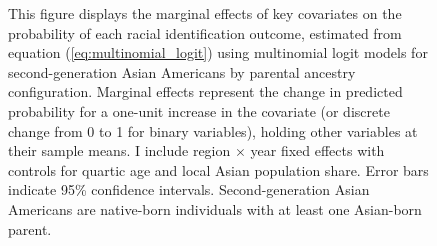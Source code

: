 \begin{center}
\begin{figure}[!htb]
\caption*{\footnotesize{This figure displays the marginal effects of key covariates on the probability of each racial identification outcome, estimated from equation (\ref{eq:multinomial_logit}) using multinomial logit models for second-generation Asian Americans by parental ancestry configuration. Marginal effects represent the change in predicted probability for a one-unit increase in the covariate (or discrete change from 0 to 1 for binary variables), holding other variables at their sample means. I include region $\times$ year fixed effects with controls for quartic age and local Asian population share. Error bars indicate 95\% confidence intervals. Second-generation Asian Americans are native-born individuals with at least one Asian-born parent.}}
\end{figure}
\end{center}

\pagebreak
\newpage

